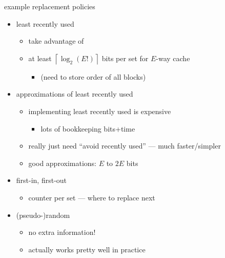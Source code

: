 \begin{frame}{example replacement policies}
\begin{itemize}
    \item least recently used
        \begin{itemize}
        \item take advantage of 
        \item at least $\left\lceil\log_2(E!)\right\rceil$ bits per set for $E$-way cache
            \begin{itemize}
            \item (need to store order of all blocks)
            \end{itemize}
        \end{itemize}
    \item approximations of least recently used
        \begin{itemize}
        \item implementing least recently used is expensive 
            \begin{itemize}
            \item lots of bookkeeping bits+time
            \end{itemize}
        \item really just need ``avoid recently used'' --- much faster/simpler
        \item good approximations: $E$ to $2E$ bits
        \end{itemize}
    \item first-in, first-out
        \begin{itemize}
        \item counter per set --- where to replace next
        \end{itemize}
    \item (pseudo-)random
        \begin{itemize}
        \item no extra information!
        \item actually works pretty well in practice
        \end{itemize}
\end{itemize}
\end{frame}

